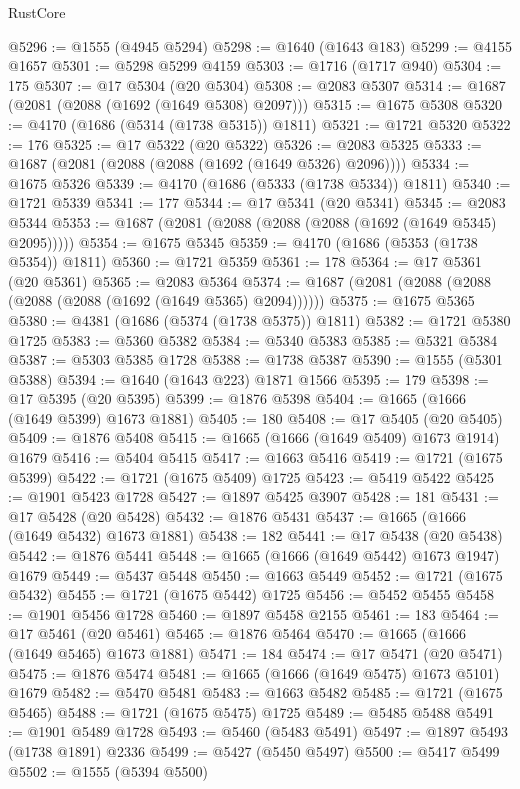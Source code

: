\begin{lexlean}{RustCore}
\begin{coremodule}
@5296 := @1555 (@4945 @5294)
@5298 := @1640 (@1643 @183)
@5299 := @4155 @1657
@5301 := @5298 @5299 @4159
@5303 := @1716 (@1717 @940)
@5304 := 175
@5307 := @17 @5304 (@20 @5304)
@5308 := @2083 @5307
@5314 := @1687 (@2081 (@2088 (@1692 (@1649 @5308) @2097)))
@5315 := @1675 @5308
@5320 := @4170 (@1686 (@5314 (@1738 @5315)) @1811)
@5321 := @1721 @5320
@5322 := 176
@5325 := @17 @5322 (@20 @5322)
@5326 := @2083 @5325
@5333 := @1687 (@2081 (@2088 (@2088 (@1692 (@1649 @5326) @2096))))
@5334 := @1675 @5326
@5339 := @4170 (@1686 (@5333 (@1738 @5334)) @1811)
@5340 := @1721 @5339
@5341 := 177
@5344 := @17 @5341 (@20 @5341)
@5345 := @2083 @5344
@5353 := @1687 (@2081 (@2088 (@2088 (@2088 (@1692 (@1649 @5345) @2095)))))
@5354 := @1675 @5345
@5359 := @4170 (@1686 (@5353 (@1738 @5354)) @1811)
@5360 := @1721 @5359
@5361 := 178
@5364 := @17 @5361 (@20 @5361)
@5365 := @2083 @5364
@5374 := @1687 (@2081 (@2088 (@2088 (@2088 (@2088 (@1692 (@1649 @5365) @2094))))))
@5375 := @1675 @5365
@5380 := @4381 (@1686 (@5374 (@1738 @5375)) @1811)
@5382 := @1721 @5380 @1725
@5383 := @5360 @5382
@5384 := @5340 @5383
@5385 := @5321 @5384
@5387 := @5303 @5385 @1728
@5388 := @1738 @5387
@5390 := @1555 (@5301 @5388)
@5394 := @1640 (@1643 @223) @1871 @1566
@5395 := 179
@5398 := @17 @5395 (@20 @5395)
@5399 := @1876 @5398
@5404 := @1665 (@1666 (@1649 @5399) @1673 @1881)
@5405 := 180
@5408 := @17 @5405 (@20 @5405)
@5409 := @1876 @5408
@5415 := @1665 (@1666 (@1649 @5409) @1673 @1914) @1679
@5416 := @5404 @5415
@5417 := @1663 @5416
@5419 := @1721 (@1675 @5399)
@5422 := @1721 (@1675 @5409) @1725
@5423 := @5419 @5422
@5425 := @1901 @5423 @1728
@5427 := @1897 @5425 @3907
@5428 := 181
@5431 := @17 @5428 (@20 @5428)
@5432 := @1876 @5431
@5437 := @1665 (@1666 (@1649 @5432) @1673 @1881)
@5438 := 182
@5441 := @17 @5438 (@20 @5438)
@5442 := @1876 @5441
@5448 := @1665 (@1666 (@1649 @5442) @1673 @1947) @1679
@5449 := @5437 @5448
@5450 := @1663 @5449
@5452 := @1721 (@1675 @5432)
@5455 := @1721 (@1675 @5442) @1725
@5456 := @5452 @5455
@5458 := @1901 @5456 @1728
@5460 := @1897 @5458 @2155
@5461 := 183
@5464 := @17 @5461 (@20 @5461)
@5465 := @1876 @5464
@5470 := @1665 (@1666 (@1649 @5465) @1673 @1881)
@5471 := 184
@5474 := @17 @5471 (@20 @5471)
@5475 := @1876 @5474
@5481 := @1665 (@1666 (@1649 @5475) @1673 @5101) @1679
@5482 := @5470 @5481
@5483 := @1663 @5482
@5485 := @1721 (@1675 @5465)
@5488 := @1721 (@1675 @5475) @1725
@5489 := @5485 @5488
@5491 := @1901 @5489 @1728
@5493 := @5460 (@5483 @5491)
@5497 := @1897 @5493 (@1738 @1891) @2336
@5499 := @5427 (@5450 @5497)
@5500 := @5417 @5499
@5502 := @1555 (@5394 @5500)

\end{coremodule}
\end{lexlean}
